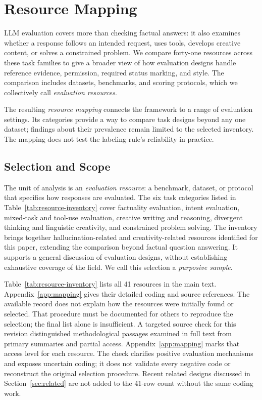 \documentclass{clv2025}
\begin{document}
\section{Resource Mapping}\label{sec:methodology}

LLM evaluation covers more than checking factual answers: it also examines
whether a response follows an intended request, uses tools, develops creative
content, or solves a constrained problem. We compare forty-one resources
across these task families to give a broader view of how evaluation designs
handle reference evidence, permission, required status marking, and style.
The comparison includes datasets, benchmarks, and scoring protocols, which
we collectively call \emph{evaluation resources}.

The resulting \emph{resource mapping} connects the framework to a range of
evaluation settings. Its categories provide a way to compare task designs
beyond any one dataset; findings about their prevalence remain limited to
the selected inventory. The mapping does not test the labeling rule's
reliability in practice.

\subsection{Selection and Scope}

The unit of analysis is an \emph{evaluation resource}: a benchmark, dataset,
or protocol that specifies how responses are evaluated. The six task categories listed in
Table~\ref{tab:resource-inventory} cover factuality evaluation, intent evaluation,
mixed-task and tool-use evaluation, creative writing and reasoning, divergent
thinking and linguistic creativity, and constrained problem solving.
The inventory brings together hallucination-related and creativity-related
resources identified for this paper, extending the comparison beyond
factual question answering. It supports a general discussion of evaluation
designs, without establishing exhaustive coverage of the field. We call
this selection a \emph{purposive sample}.

Table~\ref{tab:resource-inventory} lists all 41 resources in the main text.
Appendix~\ref{app:mapping} gives their detailed coding and source references. The available record does not explain how the resources were initially
found or selected. That procedure must be documented for others to reproduce
the selection; the final list alone is insufficient.
A targeted source check for this revision distinguished methodological
passages examined in full text from primary summaries and partial access.
Appendix~\ref{app:mapping} marks that access level for each resource.
The check clarifies positive evaluation mechanisms and exposes uncertain
coding; it does not validate every negative code or reconstruct the original
selection procedure. Recent related designs discussed in
Section~\ref{sec:related} are not added to the 41-row count without the same
coding work.
\end{document}
